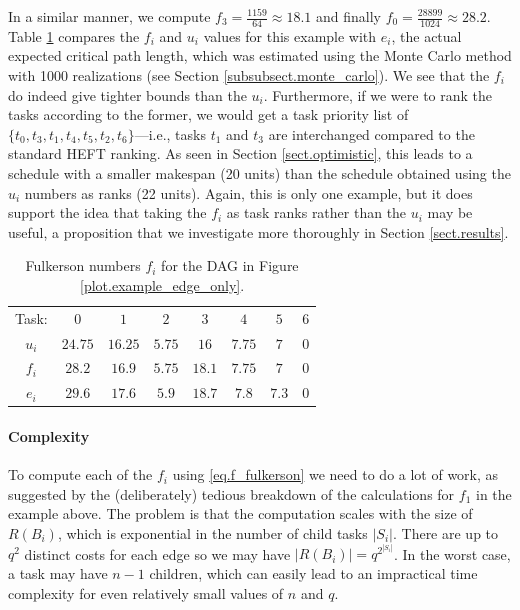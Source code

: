 \documentclass[12pt]{article}
\begin{document}
In a similar manner, we compute $f_3 = \frac{1159}{64} \approx 18.1$ and finally $f_0 = \frac{28899}{1024} \approx 28.2$. Table \ref{tb.fulk_example} compares the $f_i$ and $u_i$ values for this example with $e_i$, the actual expected critical path length, which was estimated using the Monte Carlo method with 1000 realizations (see Section \ref{subsubsect.monte_carlo}). We see that the $f_i$ do indeed give tighter bounds than the $u_i$. Furthermore, if we were to rank the tasks according to the former, we would get a task priority list of $\{t_0, t_3, t_1, t_4, t_5, t_2, t_6\}$---i.e., tasks $t_1$ and $t_3$ are interchanged compared to the standard HEFT ranking. As seen in Section \ref{sect.optimistic}, this leads to a schedule with a smaller makespan (20 units) than the schedule obtained using the $u_i$ numbers as ranks (22 units). Again, this is only one example, but it does support the idea that taking the $f_i$ as task ranks rather than the $u_i$ may be useful, a proposition that we investigate more thoroughly in Section \ref{sect.results}.     

\begin{table}
	\caption{Fulkerson numbers $f_i$ for the DAG in Figure \ref{plot.example_edge_only}.} 
	\begin{center}	
		\begin{tabular}{c c c c c c c c}
			\cmidrule{1-8}
			Task: & $0$ & $1$ & $2$ & $3$ & $4$ & $5$ & $6$\\
			\cmidrule{1-8}
			$u_i$ & $24.75$ & $16.25$ & $5.75$ & $16$ & $7.75$ & $7$ & $0$\\
			$f_i$ & $28.2$ & $16.9$ & $5.75$ & $18.1$ & $7.75$ & $7$ & $0$ \\
			$e_i$ & $29.6$ & $17.6$ & $5.9$ & $18.7$ & $7.8$ & $7.3$ & $0$ \\
			\bottomrule
		\end{tabular}
		\label{tb.fulk_example}
	\end{center}	
\end{table}

\paragraph{Complexity}
\label{para.fulkerson_computing}

To compute each of the $f_i$ using \eqref{eq.f_fulkerson} we need to do a lot of work, as suggested by the (deliberately) tedious breakdown of the calculations for $f_1$ in the example above. The problem is that the computation scales with the size of $R(B_i)$, which is exponential in the number of child tasks $|S_i|$. There are up to $q^2$ distinct costs for each edge so we may have $|R(B_i)| = q^{2^{|S_i|}}$. In the worst case, a task may have $n - 1$ children, which can easily lead to an impractical time complexity for even relatively small values of $n$ and $q$. 
\end{document}
